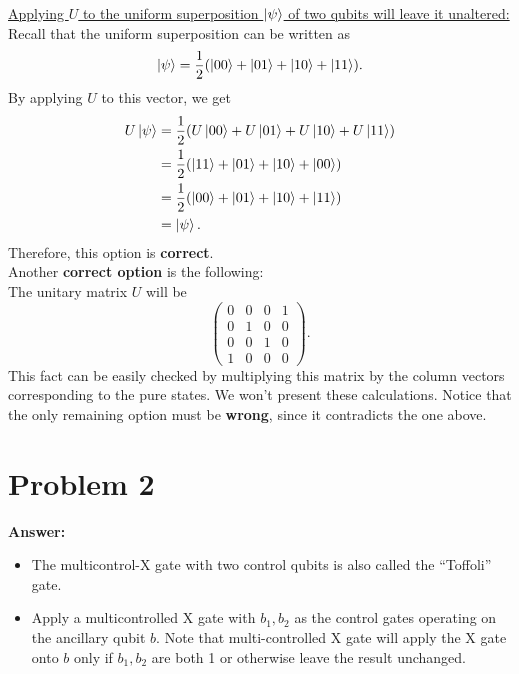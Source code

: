 \documentclass[10pt]{article}
\begin{document}
\uline{Applying \(U\) to the uniform superposition \(\ket{\psi}\) of two qubits
will leave it unaltered:}\\
Recall that the uniform superposition can be written as
\begin{equation}
\ket{\psi}=\frac{1}{2}(\ket{00}+\ket{01}+\ket{10}+\ket{11}).
\end{equation}
By applying \(U\) to this vector, we get
\begin{align}
  \begin{split}
    U\ket{\psi}&=\frac{1}{2}(U\ket{00}+U\ket{01}+U\ket{10}+U\ket{11})\\
    &=\frac{1}{2}(\ket{11}+\ket{01}+\ket{10}+\ket{00})\\
    &=\frac{1}{2}(\ket{00}+\ket{01}+\ket{10}+\ket{11})\\
    &=\ket{\psi}.
  \end{split}
\end{align}
Therefore, this option is \textbf{correct}.\\

Another \textbf{correct option} is the following:\\
The unitary matrix \(U\) will be
\begin{equation}
\begin{pmatrix}
  0 & 0 & 0 & 1\\
  0 & 1 & 0 & 0\\
  0 & 0 & 1 & 0\\
  1 & 0 & 0 & 0
\end{pmatrix}.
\end{equation}
This fact can be easily checked by multiplying this matrix by the column vectors
corresponding to the pure states. We won't present these calculations. Notice
that the only remaining option must be \textbf{wrong}, since it contradicts the one
above.

\newpage
\section*{Problem 2}
\label{sec:org50fab4f}
\textbf{Answer:}
\begin{itemize}
\item The multicontrol-X gate with two control qubits is also called the ``Toffoli''
gate.
\item Apply a multicontrolled X gate with \(b_1,b_2\) as the control gates
operating on the ancillary qubit \(b\). Note that multi-controlled X gate
will apply the X gate onto \(b\) only if \(b_1,b_2\) are both 1 or
otherwise leave the result unchanged.\\
\end{itemize}
\end{document}
